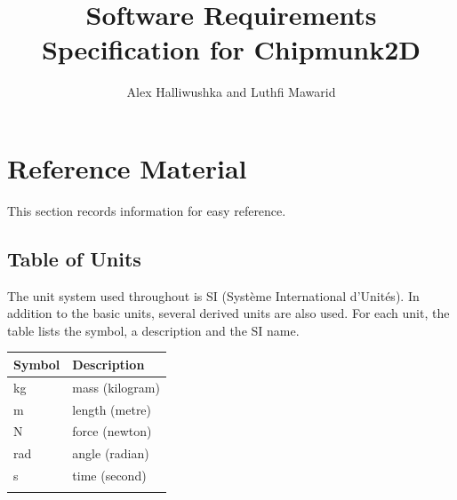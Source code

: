 \documentclass[12pt]{article}
\title{Software Requirements Specification for Chipmunk2D}
\author{Alex Halliwushka and Luthfi Mawarid}
\begin{document}
\maketitle
\tableofcontents
\newpage
\section{Reference Material}
\label{Sec:RefMat}
This section records information for easy reference.
\subsection{Table of Units}
\label{Sec:ToU}
The unit system used throughout is SI (Système International d'Unités). In addition to the basic units, several derived units are also used. For each unit, the table lists the symbol, a description and the SI name.
\begin{longtable*}{l l}
\toprule
Symbol & Description
\\
\midrule
kg & mass (kilogram)
\\
m & length (metre)
\\
N & force (newton)
\\
rad & angle (radian)
\\
s & time (second)
\\
\bottomrule
\label{Table:ToU}
\end{longtable*}
\end{document}
